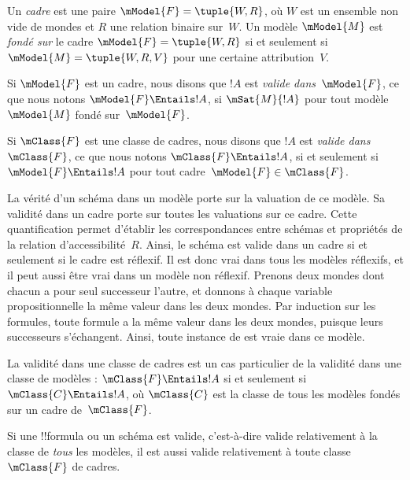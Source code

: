 \documentclass[../../../include/open-logic-section]{subfiles}
\begin{document}


\begin{defn}
  Un \emph{cadre} est une paire $\mModel{F} = \tuple{W,R}$,
  où $W$ est un ensemble non vide de mondes et $R$ une relation
  binaire sur~$W$. Un modèle $\mModel{M}$ est \emph{fondé sur}
  le cadre $\mModel{F} = \tuple{W,R}$ si et seulement si
  $\mModel{M} = \tuple{W, R, V}$ pour une certaine attribution~$V$.
\end{defn}

\begin{defn}
  Si $\mModel{F}$ est un cadre, nous disons que $!A$ est
  \emph{valide dans~$\mModel{F}$}, ce que nous notons
  $\mModel{F} \Entails !A$, si $\mSat{M}{!A}$ pour tout
  modèle~$\mModel{M}$ fondé sur~$\mModel{F}$.

  Si $\mClass{F}$ est une classe de cadres, nous disons que
  $!A$ est \emph{valide dans~$\mClass{F}$}, ce que nous notons
  $\mClass{F} \Entails !A$, si et seulement si
  $\mModel{F} \Entails !A$ pour tout
  cadre~$\mModel{F} \in \mClass{F}$.
\end{defn}

La vérité d'un schéma dans un modèle porte sur la valuation
de ce modèle. Sa validité dans un cadre porte sur toutes
les valuations sur ce cadre. Cette quantification permet d'établir
les correspondances entre schémas et propriétés de la relation
d'accessibilité~$R$. Ainsi, le schéma  est valide dans un
cadre si et seulement si le cadre est réflexif. Il est donc vrai
dans tous les modèles réflexifs, et il peut aussi être vrai dans
un modèle non réflexif. Prenons deux mondes dont chacun a pour
seul successeur l'autre, et donnons à chaque variable
propositionnelle la même valeur dans les deux mondes. Par
induction sur les formules, toute formule a la même valeur dans
les deux mondes, puisque leurs successeurs s'échangent.
Ainsi, toute instance de  est vraie dans ce modèle.

\begin{rem}
La validité dans une classe de cadres est un cas particulier
de la validité dans une classe de modèles :
$\mClass{F} \Entails !A$ si et seulement si
$\mClass{C} \Entails !A$, où $\mClass{C}$ est la classe
de tous les modèles fondés sur un cadre de~$\mClass{F}$.

Si une !!{formula} ou un schéma est valide, c'est-à-dire
valide relativement à la classe de \emph{tous} les modèles,
il est aussi valide relativement à toute classe~$\mClass{F}$
de cadres.
\end{rem}
\end{document}
